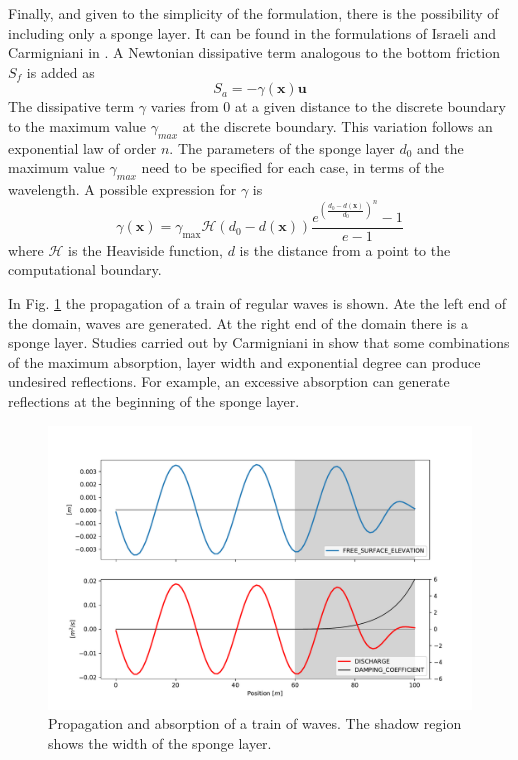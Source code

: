 Finally, and given to the simplicity of the formulation, there is the possibility of including only a sponge layer. It can be found in the formulations of Israeli and Carmigniani in \cite{israeli1981,carmigniani2018}. A Newtonian dissipative term analogous to the bottom friction $S_f$ is added as
\begin{equation}
    S_a = -\gamma(\mathbf{x}) \mathbf{u}
\end{equation}
The dissipative term $\gamma$ varies from 0 at a given distance to the discrete boundary to the maximum value $\gamma_{max}$ at the discrete boundary. This variation follows an exponential law \cite{peric2018} of order $n$. The parameters of the sponge layer $d_0$ and the maximum value $\gamma_{max}$ need to be specified for each case, in terms of the wavelength.
A possible expression for $\gamma$ is
\begin{equation} \label{exponential_sponge_layer}
    \gamma(\mathbf{x}) = \gamma_{\max} \mathcal{H}(d_0 - d(\mathbf{x})) \frac{e^{\left(\frac{d_0 - d(\mathbf{x})}{d_0}\right)^n} - 1}{e - 1}
\end{equation}
where $\mathcal{H}$ is the Heaviside function, $d$ is the distance from a point to the computational boundary.

In Fig. \ref{absorbing_boundary} the propagation of a train of regular waves is shown. Ate the left end of the domain, waves are generated. At the right end of the domain there is a sponge layer. Studies carried out by Carmigniani in \cite{carmigniani2018} show that some combinations of the maximum absorption, layer width and exponential degree can produce undesired reflections. For example, an excessive absorption can generate reflections at the beginning of the sponge layer.


\begin{figure}[ht]
    \centering
    \includegraphics[width=.8\textwidth]{img/absorbing_boundary/absorbing_boundary.pdf}
    \caption{Propagation and absorption of a train of waves. The shadow region shows the width of the sponge layer.}
    \label{absorbing_boundary}
\end{figure}


